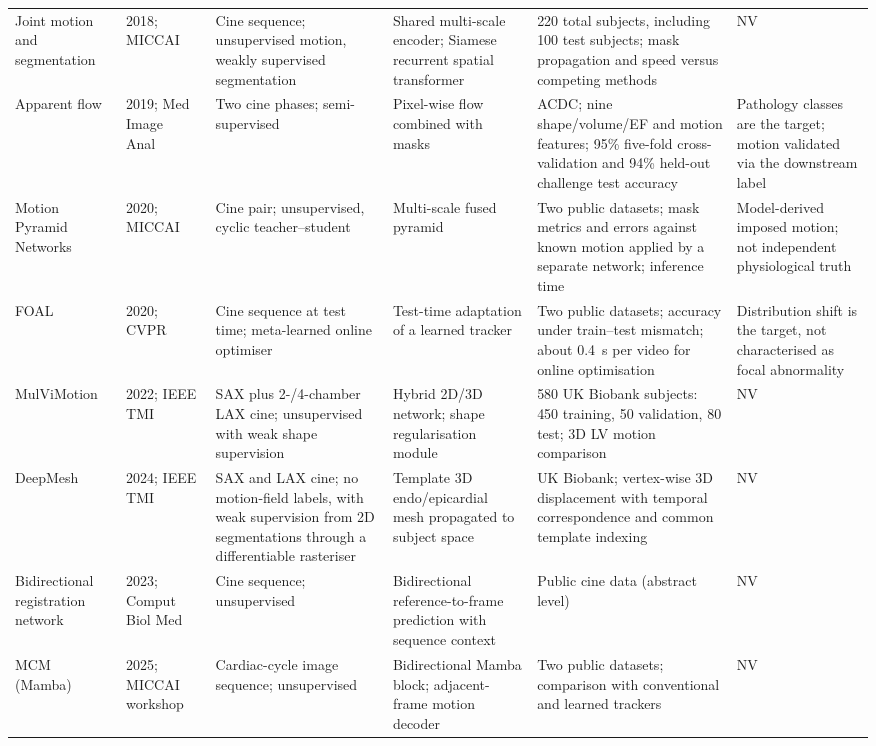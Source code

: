 \documentclass[11pt,a4paper]{article}
\begin{document}
{\begin{longtable}{L{0.107\textwidth}L{0.111\textwidth}L{0.155\textwidth}L{0.179\textwidth}L{0.199\textwidth}L{0.16\textwidth}}
Joint motion and segmentation & 2018; MICCAI~\cite{qin2018joint} & Cine sequence; unsupervised motion, weakly supervised segmentation & Shared multi-scale encoder; Siamese recurrent spatial transformer & 220 total subjects, including 100 test subjects; mask propagation and speed versus competing methods & NV \\
\addlinespace
Apparent flow & 2019; Med Image Anal~\cite{zheng2019apparent} & Two cine phases; semi-supervised & Pixel-wise flow combined with masks & ACDC; nine shape/volume/EF and motion features; 95\% five-fold cross-validation and 94\% held-out challenge test accuracy & Pathology classes are the target; motion validated via the downstream label \\
\addlinespace
Motion Pyramid Networks & 2020; MICCAI~\cite{yu2020mpn} & Cine pair; unsupervised, cyclic teacher--student & Multi-scale fused pyramid & Two public datasets; mask metrics and errors against known motion applied by a separate network; inference time & Model-derived imposed motion; not independent physiological truth \\
\addlinespace
FOAL & 2020; CVPR~\cite{yu2020foal} & Cine sequence at test time; meta-learned online optimiser & Test-time adaptation of a learned tracker & Two public datasets; accuracy under train--test mismatch; about 0.4~s per video for online optimisation & Distribution shift is the target, not characterised as focal abnormality \\
\addlinespace
MulViMotion & 2022; IEEE TMI~\cite{meng2022mulvimotion} & SAX plus 2-/4-chamber LAX cine; unsupervised with weak shape supervision & Hybrid 2D/3D network; shape regularisation module & 580 UK Biobank subjects: 450 training, 50 validation, 80 test; 3D LV motion comparison & NV \\
\addlinespace
DeepMesh & 2024; IEEE TMI~\cite{meng2024deepmesh} & SAX and LAX cine; no motion-field labels, with weak supervision from 2D segmentations through a differentiable rasteriser & Template 3D endo/epicardial mesh propagated to subject space & UK Biobank; vertex-wise 3D displacement with temporal correspondence and common template indexing & NV \\
\addlinespace
Bidirectional registration network & 2023; Comput Biol Med~\cite{lu2023bireg} & Cine sequence; unsupervised & Bidirectional reference-to-frame prediction with sequence context & Public cine data (abstract level) & NV \\
\addlinespace
MCM (Mamba) & 2025; MICCAI work\-shop~\cite{yin2025mcm} & Cardiac-cycle image sequence; unsupervised & Bidirectional Mamba block; adjacent-frame motion decoder & Two public datasets; comparison with conventional and learned trackers & NV \\

\end{longtable}}
\end{document}

